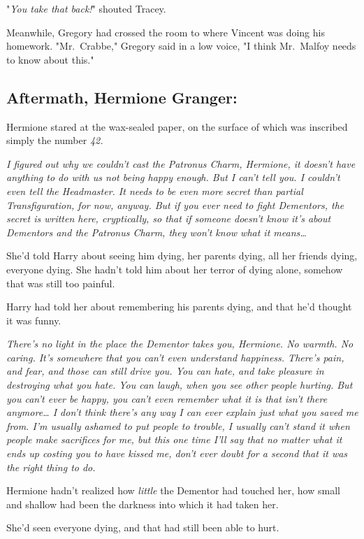 "\emph{You take that back!}" shouted Tracey.

Meanwhile, Gregory had crossed the room to where Vincent was doing his 
homework. "Mr.~Crabbe," Gregory said in a low voice, "I think Mr.~Malfoy needs 
to know about this."
\sbreak
\vspace{-2\baselineskip}
\subsection{Aftermath, Hermione Granger:}

Hermione stared at the wax-sealed paper, on the surface of which was inscribed 
simply the number \emph{42.}

\emph{I figured out why we couldn't cast the Patronus Charm, Hermione, it 
doesn't have anything to do with us not being happy enough. But I can't tell 
you. I couldn't even tell the Headmaster. It needs to be even more secret than 
partial Transfiguration, for now, anyway. But if you ever need to fight 
Dementors, the secret is written here, cryptically, so that if someone doesn't 
know it's about Dementors and the Patronus Charm, they won't know what it 
means{\ldots}}

She'd told Harry about seeing him dying, her parents dying, all her friends 
dying, everyone dying. She hadn't told him about her terror of dying alone, 
somehow that was still too painful.

Harry had told her about remembering his parents dying, and that he'd thought 
it was funny.

\emph{There's no light in the place the Dementor takes you, Hermione. No 
warmth. No caring. It's somewhere that you can't even understand happiness. 
There's pain, and fear, and those can still drive you. You can hate, and take 
pleasure in destroying what you hate. You can laugh, when you see other people 
hurting. But you can't ever be happy, you can't even remember what it is that 
isn't there anymore{\ldots} I don't think there's any way I can ever explain 
just what you saved me from. I'm usually ashamed to put people to trouble, I 
usually can't stand it when people make sacrifices for me, but this one time 
I'll say that no matter what it ends up costing you to have kissed me, don't 
ever doubt for a second that it was the right thing to do.}

Hermione hadn't realized how \emph{little} the Dementor had touched her, how 
small and shallow had been the darkness into which it had taken her.

She'd seen everyone dying, and that had still been able to hurt.

